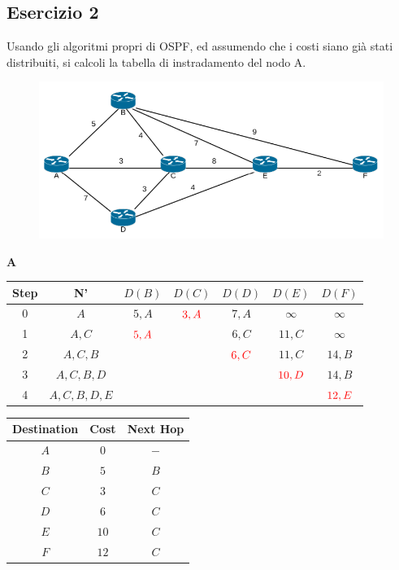 \documentclass[10pt]{article}
\begin{document}
	\subsection{Esercizio 2}
	Usando gli algoritmi propri di OSPF, ed assumendo che i costi siano già stati distribuiti, si calcoli la tabella di instradamento del nodo A.
	\begin{figure}[h]
	\centering
	\includegraphics[width=13cm]{es2}
	\end{figure}
	\begin{center}
	\textbf{A}
 		\begin{tabular}{||c c c c c c c||} 
 			\hline
 			Step & N' & $D(B)$ & $D(C)$ & $D(D)$ & $D(E)$ & $D(F)$ \\[0.5ex] 
 			\hline\hline
 			0 & $A$ & $5,A$ & $\color{red} 3,A$ & $7,A$ & $\infty$ & $\infty$ \\ 
 			\hline
 			1 & $A,C$ & $\color{red} 5,A$ & & $6,C$ & $11,C$ & $\infty$ \\ 
 			\hline
 			2 & $A,C,B$ & & & $\color{red} 6,C$ & $11,C$ & $14,B$ \\
 			\hline
 			3 & $A,C,B,D$ & & & & $\color{red} 10,D$ & $14,B$ \\
 			\hline
 			4 & $A,C,B,D,E$ & & & & & $\color{red} 12,E$ \\[0.5ex] 
 			\hline
		\end{tabular}
		\quad
		\begin{tabular}{||c || c || c||}
			\hline
 			Destination & Cost & Next Hop\\[0.5ex] 
 			\hline\hline
			$A$ & $0$ & $-$\\
			$B$ & $5$ & $B$\\
 			$C$ & $3$ & $C$\\
			$D$ & $6$ & $C$\\
			$E$ & $10$ & $C$\\
			$F$ & $12$ & $C$\\[0.5ex] 
			\hline
		\end{tabular}
	\end{center}
	
\end{document}
